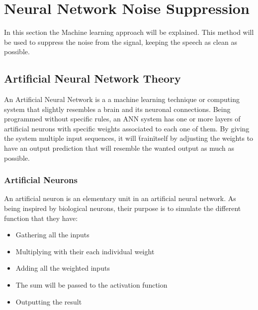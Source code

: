 \chapter{Neural Network Noise Suppression}\label{NeuralNetworkNoiseSuppression}
In this section the Machine learning approach will be explained.
This method will be used to suppress the noise from the signal, keeping the speech as clean as possible.

\section{Artificial Neural Network Theory}

An Artificial Neural Network is a a machine learning technique or computing system that slightly resembles a brain and its neuronal connections. Being programmed without specific rules, an ANN system has one or more layers of artificial neurons with specific weights associated to each one of them. By giving the system multiple input sequences, it will \"train\" itself by adjusting the weights to have an output prediction that will resemble the wanted output as much as possible.

\subsection{Artificial  Neurons}

An artificial neuron is an elementary unit in an artificial neural network. As being inspired by biological neurons, their purpose is to simulate the different function that they have:
\begin{itemize}
\item Gathering all the inputs
\item Multiplying with their each individual weight
\item Adding all the weighted inputs
\item The sum will be passed to the activation function
\item Outputting the result
\end{itemize}

